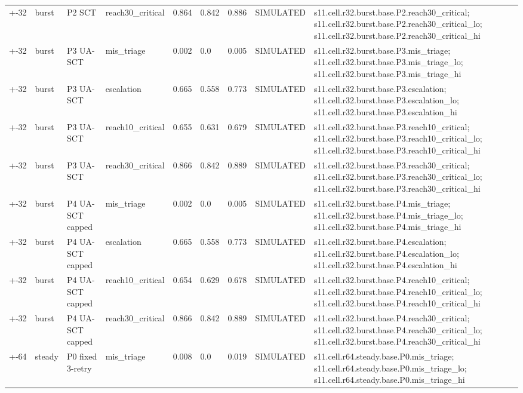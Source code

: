 \begin{table}[t]
\begin{tabular}{lllllllll}
+-32 & burst & P2 SCT & reach30\_critical & 0.864 & 0.842 & 0.886 & SIMULATED & s11.cell.r32.burst.base.P2.reach30\_critical; s11.cell.r32.burst.base.P2.reach30\_critical\_lo; s11.cell.r32.burst.base.P2.reach30\_critical\_hi \\
+-32 & burst & P3 UA-SCT & mis\_triage & 0.002 & 0.0 & 0.005 & SIMULATED & s11.cell.r32.burst.base.P3.mis\_triage; s11.cell.r32.burst.base.P3.mis\_triage\_lo; s11.cell.r32.burst.base.P3.mis\_triage\_hi \\
+-32 & burst & P3 UA-SCT & escalation & 0.665 & 0.558 & 0.773 & SIMULATED & s11.cell.r32.burst.base.P3.escalation; s11.cell.r32.burst.base.P3.escalation\_lo; s11.cell.r32.burst.base.P3.escalation\_hi \\
+-32 & burst & P3 UA-SCT & reach10\_critical & 0.655 & 0.631 & 0.679 & SIMULATED & s11.cell.r32.burst.base.P3.reach10\_critical; s11.cell.r32.burst.base.P3.reach10\_critical\_lo; s11.cell.r32.burst.base.P3.reach10\_critical\_hi \\
+-32 & burst & P3 UA-SCT & reach30\_critical & 0.866 & 0.842 & 0.889 & SIMULATED & s11.cell.r32.burst.base.P3.reach30\_critical; s11.cell.r32.burst.base.P3.reach30\_critical\_lo; s11.cell.r32.burst.base.P3.reach30\_critical\_hi \\
+-32 & burst & P4 UA-SCT capped & mis\_triage & 0.002 & 0.0 & 0.005 & SIMULATED & s11.cell.r32.burst.base.P4.mis\_triage; s11.cell.r32.burst.base.P4.mis\_triage\_lo; s11.cell.r32.burst.base.P4.mis\_triage\_hi \\
+-32 & burst & P4 UA-SCT capped & escalation & 0.665 & 0.558 & 0.773 & SIMULATED & s11.cell.r32.burst.base.P4.escalation; s11.cell.r32.burst.base.P4.escalation\_lo; s11.cell.r32.burst.base.P4.escalation\_hi \\
+-32 & burst & P4 UA-SCT capped & reach10\_critical & 0.654 & 0.629 & 0.678 & SIMULATED & s11.cell.r32.burst.base.P4.reach10\_critical; s11.cell.r32.burst.base.P4.reach10\_critical\_lo; s11.cell.r32.burst.base.P4.reach10\_critical\_hi \\
+-32 & burst & P4 UA-SCT capped & reach30\_critical & 0.866 & 0.842 & 0.889 & SIMULATED & s11.cell.r32.burst.base.P4.reach30\_critical; s11.cell.r32.burst.base.P4.reach30\_critical\_lo; s11.cell.r32.burst.base.P4.reach30\_critical\_hi \\
+-64 & steady & P0 fixed 3-retry & mis\_triage & 0.008 & 0.0 & 0.019 & SIMULATED & s11.cell.r64.steady.base.P0.mis\_triage; s11.cell.r64.steady.base.P0.mis\_triage\_lo; s11.cell.r64.steady.base.P0.mis\_triage\_hi \\

\end{tabular}
\end{table}
